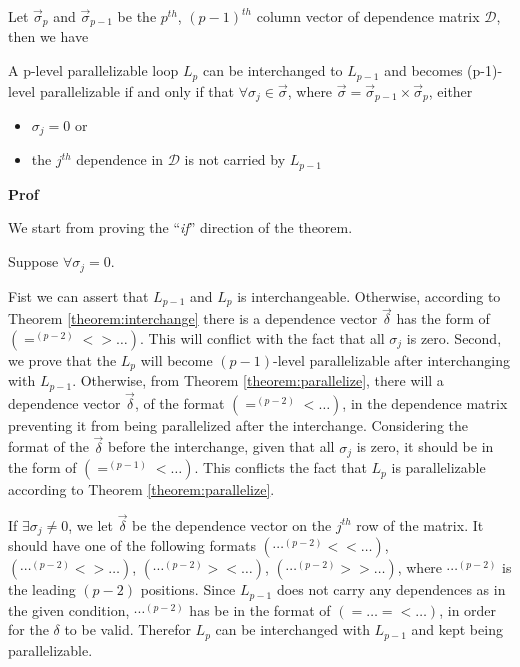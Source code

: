 Let $\vec{\sigma}_{p}$ and $\vec{\sigma}_{p-1}$ be the $p^{th}$,
$(p-1)^{th}$ column vector of dependence matrix $\mathcal{D}$, then we
have

\begin{theorem} \label{theorem:keep}
  A p-level parallelizable loop $L_{p}$ can be interchanged to
  $L_{p-1}$ and becomes (p-1)-level parallelizable if and only if that
  $\forall \sigma_{j} \in \vec{\sigma}$, where $\vec{\sigma} =
  \vec{\sigma}_{p-1} \times \vec{\sigma}_{p}$, either
  \begin{itemize}
  \item $\sigma_{j}=0$ or 
  \item the $j^{th}$ dependence in $\mathcal{D}$ is not carried by
    $L_{p-1}$
  \end{itemize}
\end{theorem} 

\begin{flushleft}
\textbf{Prof} 
\end{flushleft}

We start from proving the ``\emph{if}'' direction of the theorem.

Suppose $\forall \sigma_{j}=0$. 

Fist we can assert that $L_{p-1}$ and
$L_{p}$ is interchangeable. Otherwise, according to Theorem
\ref{theorem:interchange} there is a dependence vector $\vec{\delta}$
has the form of $(=^{(p-2)} < > \ldots)$. This will conflict with the
fact that all $\sigma_{j}$ is zero.
Second, we prove that the $L_{p}$ will become $(p-1)$-level
parallelizable after interchanging with $L_{p-1}$.  Otherwise, from
Theorem \ref{theorem:parallelize}, there will a dependence vector
$\vec{\delta}$, of the format $(=^{(p-2)} < \ldots)$, in the
dependence matrix preventing it from being parallelized after the
interchange. Considering the format of the $\vec{\delta}$ before the
interchange, given that all $\sigma_{j}$ is zero, it should be in the
form of $(=^{(p-1)} < \ldots)$. This conflicts the fact that $L_{p}$
is parallelizable according to Theorem \ref{theorem:parallelize}.

If $\exists \sigma_{j} \neq 0$, we let $\vec{\delta}$ be the
dependence vector on the $j^{th}$ row of the matrix. It should have
one of the following formats $(\cdots^{(p-2)} < < \ldots)$,
$(\cdots^{(p-2)} < > \ldots)$, $(\cdots^{(p-2)} > < \ldots)$,
$(\cdots^{(p-2)} > > \ldots)$, where $\cdots^{(p-2)}$ is the leading
$(p-2)$ positions. Since $L_{p-1}$ does not carry any dependences as
in the given condition, $\cdots^{(p-2)}$ has be in the format of
$(= \ldots = < \ldots)$, in order for the $\delta$ to be valid. Therefor
$L_{p}$ can be interchanged with $L_{p-1}$ and kept being
parallelizable.

